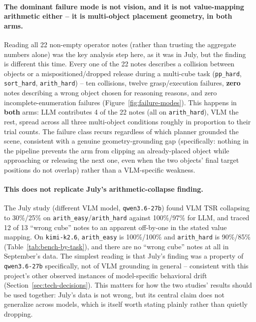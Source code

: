 \paragraph{The dominant failure mode is not vision, and it is not
value-mapping arithmetic either -- it is multi-object placement geometry,
in both arms.} Reading all 22 non-empty operator notes (rather than
trusting the aggregate numbers alone) was the key analysis step here, as it
was in July, but the finding is different this time. Every one of the 22
notes describes a collision between objects or a mispositioned/dropped
release during a multi-cube task (\texttt{pp\_hard}, \texttt{sort\_hard},
\texttt{arith\_hard}) -- ten collisions, twelve grasp/execution failures,
\textbf{zero} notes describing a wrong object chosen for reasoning reasons,
and zero incomplete-enumeration failures (Figure~\ref{fig:failure-modes}).
This happens in \textbf{both} arms: LLM contributes 4 of the 22 notes (all
on \texttt{arith\_hard}), VLM the rest, spread across all three
multi-object conditions roughly in proportion to their trial counts. The
failure class recurs regardless of which planner grounded the scene,
consistent with a genuine geometry-grounding gap (specifically: nothing in
the pipeline prevents the arm from clipping an already-placed object while
approaching or releasing the next one, even when the two objects' final
target positions do not overlap) rather than a VLM-specific weakness.

\paragraph{This does not replicate July's arithmetic-collapse finding.} The
July study (different VLM model, \texttt{qwen3.6-27b}) found VLM TSR
collapsing to 30\%/25\% on \texttt{arith\_easy}/\texttt{arith\_hard} against
100\%/97\% for LLM, and traced 12 of 13 ``wrong cube'' notes to an
apparent off-by-one in the stated value mapping. On \texttt{kimi-k2.6},
\texttt{arith\_easy} is 100\%/100\% and \texttt{arith\_hard} is 90\%/85\%
(Table~\ref{tab:bench-by-task}), and there are no ``wrong cube'' notes at
all in September's data. The simplest reading is that July's finding was a
property of \texttt{qwen3.6-27b} specifically, not of VLM grounding in
general -- consistent with this project's other observed instances of
model-specific behavioral drift (Section~\ref{sec:tech-decisions}). This
matters for how the two studies' results should be used together: July's
data is not wrong, but its central claim does not generalize across models,
which is itself worth stating plainly rather than quietly dropping.

